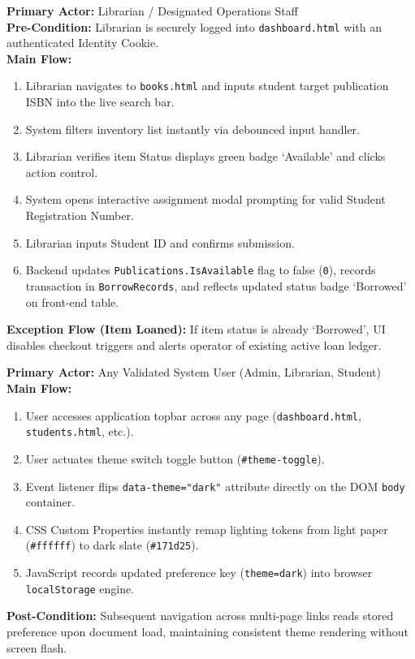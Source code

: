 \documentclass[11pt,a4paper]{report}
\begin{document}
\begin{engbox}
\textbf{Primary Actor:} Librarian / Designated Operations Staff\\
\textbf{Pre-Condition:} Librarian is securely logged into \texttt{dashboard.html} with an authenticated Identity Cookie.\\
\textbf{Main Flow:}
\begin{enumerate}[leftmargin=1.2em, topsep=2pt, itemsep=1pt]
    \item Librarian navigates to \texttt{books.html} and inputs student target publication ISBN into the live search bar.
    \item System filters inventory list instantly via debounced input handler.
    \item Librarian verifies item Status displays green badge `Available' and clicks action control.
    \item System opens interactive assignment modal prompting for valid Student Registration Number.
    \item Librarian inputs Student ID and confirms submission.
    \item Backend updates \texttt{Publications.IsAvailable} flag to false (\texttt{0}), records transaction in \texttt{BorrowRecords}, and reflects updated status badge `Borrowed' on front-end table.
\end{enumerate}
\textbf{Exception Flow (Item Loaned):} If item status is already `Borrowed', UI disables checkout triggers and alerts operator of existing active loan ledger.
\end{engbox}

\begin{engbox}
\textbf{Primary Actor:} Any Validated System User (Admin, Librarian, Student)\\
\textbf{Main Flow:}
\begin{enumerate}[leftmargin=1.2em, topsep=2pt, itemsep=1pt]
    \item User accesses application topbar across any page (\texttt{dashboard.html}, \texttt{students.html}, etc.).
    \item User actuates theme switch toggle button (\texttt{\#theme-toggle}).
    \item Event listener flips \texttt{data-theme="dark"} attribute directly on the DOM \texttt{body} container.
    \item CSS Custom Properties instantly remap lighting tokens from light paper (\texttt{\#ffffff}) to dark slate (\texttt{\#171d25}).
    \item JavaScript records updated preference key (\texttt{theme=dark}) into browser \texttt{localStorage} engine.
\end{enumerate}
\textbf{Post-Condition:} Subsequent navigation across multi-page links reads stored preference upon document load, maintaining consistent theme rendering without screen flash.
\end{engbox}
\end{document}
